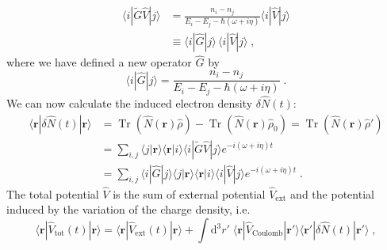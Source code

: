 \documentclass[a4paper,12pt]{article}
\begin{document}
    \begin{equation*} 
    \begin{aligned}
        \langle i | \widetilde G \hat V | j \rangle 
            &= \frac{n_i - n_j}{E_i - E_j - \hbar(\omega + i\eta)}\langle i | \hat V | j \rangle \\
            &\equiv \langle i | \hat G | j \rangle \, \langle i | \hat V | j \rangle\; ,
    \end{aligned}
    \end{equation*}
    where we have defined a new operator $\hat G$ by 
    \begin{equation} \label{eq:qm:g_function}
        \langle i | \hat G | j \rangle = \frac{n_i - n_j}{E_i - E_j - \hbar(\omega + i\eta)} \; .
    \end{equation}
    We can now calculate the induced electron density $\delta\hat N(t)$:
    \begin{equation} \label{eq:qm:chi_function_t}
    \begin{aligned}
        \langle \mathbf{r} | \delta\hat N(t) | \mathbf{r} \rangle
            &= \operatorname{Tr}(\hat N(\mathbf{r}) \hat\rho) - \operatorname{Tr}(\hat N(\mathbf{r}) \hat\rho_0) = \operatorname{Tr}(\hat N(\mathbf{r})\hat\rho') \\
            &= \sum_{i,j} \langle j|\mathbf{r}\rangle \langle\mathbf{r}| i\rangle \langle i| \widetilde G \hat V | j \rangle e^{-i (\omega + i\eta) t} \\
            &= \sum_{i,j} \langle i | \hat G | j \rangle \langle j|\mathbf{r}\rangle \langle\mathbf{r}| i\rangle \langle i| \hat V | j \rangle e^{-i (\omega + i\eta) t} \; .
    \end{aligned}
    \end{equation}
    The total potential $\hat V$ is the sum of external potential $\hat V_\text{ext}$ and the potential induced by the variation of the charge density, i.e.
    \begin{equation} \label{eq:qm:self_consistency_t}
        \langle \mathbf{r} | \hat V_\text{tot}(t) | \mathbf{r} \rangle
            = \langle \mathbf{r} | \hat V_\text{ext}(t) | \mathbf{r} \rangle + \int\!\! \text{d}^3 r' \; \langle \mathbf{r} | \hat V_\text{Coulomb} | \mathbf{r'} \rangle \langle \mathbf{r'} | \delta\hat N(t) | \mathbf{r'} \rangle \; ,
    \end{equation}
\end{document}
